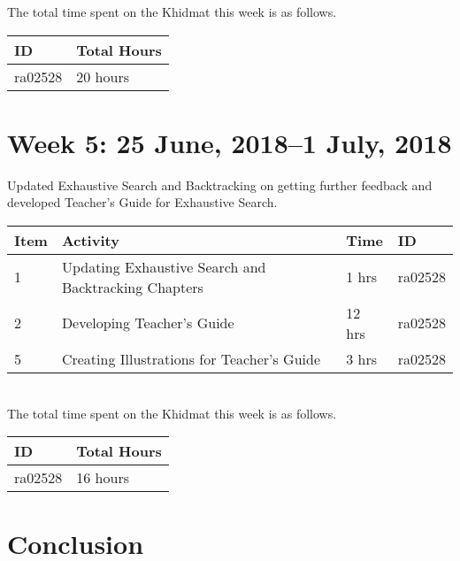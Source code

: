 \documentclass{article}
\begin{document}
The total time spent on the Khidmat this week is as follows.

\begin{tabular}{|l|l|}
  \hline
  ID & Total Hours\\\hline\hline
  ra02528 & 20 hours\\\hline
\end{tabular}


\newpage %
\section*{Week 5: 25 June, 2018--1 July, 2018}
Updated Exhaustive Search and Backtracking on getting further feedback and developed Teacher's Guide for Exhaustive Search.\\


\begin{tabular}{|l|l|l|l|}
  \hline
  Item 	& Activity & Time & ID \\\hline\hline
  1	& Updating Exhaustive Search and Backtracking Chapters & 1 hrs & ra02528 \\\hline
  2	& Developing Teacher's Guide & 12 hrs & ra02528 \\\hline
  5	& Creating Illustrations for Teacher's Guide & 3 hrs & ra02528 \\\hline
\end{tabular}\\

The total time spent on the Khidmat this week is as follows.

\begin{tabular}{|l|l|}
  \hline
  ID & Total Hours\\\hline\hline
  ra02528 & 16 hours\\\hline
\end{tabular}

\newpage
\section*{Conclusion}

\end{document}
